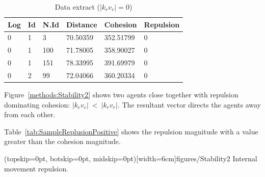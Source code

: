 \documentclass{ieeeaccess}
\begin{document}

\begin{table}[H]
\begin{center}
\begin{tabular}{| l | l | l | l | l | l |}
\hline
Log &	Id &	N.Id &	Distance &	{\color{green}Cohesion} &	{\color{red}Repulsion} 	\\ \hline
0 &	1 &	3 	 & 70.50359 &	{\color{green}352.51799} &	{\color{red}0} \\ \hline
0 &	1 &	100 & 71.78005 &	{\color{green}358.90027} &	{\color{red}0} \\ \hline
0 &	1 &	151 & 78.33995 &	{\color{green}391.69979} &	{\color{red}0} \\ \hline
0 &	2 &	99  &	72.04066 &	{\color{green}360.20334} &	{\color{red}0} \\ 
\hline
\end{tabular}\caption{Data extract ($|k_rv_r| = 0$)} \label{tab:SampleReplusion0}
\end{center}
\end{table}

Figure~\ref{methods:Stability2} shows two agents close together with repulsion dominating cohesion: $|k_cv_c|~<~|k_rv_r|$. The resultant vector directs the agents away from each other. 

Table~\ref{tab:SampleReplusionPositive} shows the repulsion magnitude with a value greater than the cohesion magnitude.

\Figure[t!](topskip=0pt, botskip=0pt, midskip=0pt)[width=6cm]{figures/Stability2}
{Internal movement repulsion.\label{methods:Stability2}}

\end{document}
